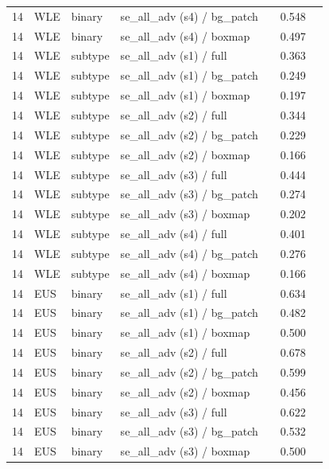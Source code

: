 \begin{longtable}{cL{1.1cm}L{1.5cm}L{5.6cm}ccc}
14 & WLE & binary & se\_all\_adv (s4) / bg\_patch & \nl{} & 0.548 & \nl{} \\
14 & WLE & binary & se\_all\_adv (s4) / boxmap & \nl{} & 0.497 & \nl{} \\
14 & WLE & subtype & se\_all\_adv (s1) / full & \nl{} & 0.363 & \nl{} \\
14 & WLE & subtype & se\_all\_adv (s1) / bg\_patch & \nl{} & 0.249 & \nl{} \\
14 & WLE & subtype & se\_all\_adv (s1) / boxmap & \nl{} & 0.197 & \nl{} \\
14 & WLE & subtype & se\_all\_adv (s2) / full & \nl{} & 0.344 & \nl{} \\
14 & WLE & subtype & se\_all\_adv (s2) / bg\_patch & \nl{} & 0.229 & \nl{} \\
14 & WLE & subtype & se\_all\_adv (s2) / boxmap & \nl{} & 0.166 & \nl{} \\
14 & WLE & subtype & se\_all\_adv (s3) / full & \nl{} & 0.444 & \nl{} \\
14 & WLE & subtype & se\_all\_adv (s3) / bg\_patch & \nl{} & 0.274 & \nl{} \\
14 & WLE & subtype & se\_all\_adv (s3) / boxmap & \nl{} & 0.202 & \nl{} \\
14 & WLE & subtype & se\_all\_adv (s4) / full & \nl{} & 0.401 & \nl{} \\
14 & WLE & subtype & se\_all\_adv (s4) / bg\_patch & \nl{} & 0.276 & \nl{} \\
14 & WLE & subtype & se\_all\_adv (s4) / boxmap & \nl{} & 0.166 & \nl{} \\
14 & EUS & binary & se\_all\_adv (s1) / full & \nl{} & 0.634 & \nl{} \\
14 & EUS & binary & se\_all\_adv (s1) / bg\_patch & \nl{} & 0.482 & \nl{} \\
14 & EUS & binary & se\_all\_adv (s1) / boxmap & \nl{} & 0.500 & \nl{} \\
14 & EUS & binary & se\_all\_adv (s2) / full & \nl{} & 0.678 & \nl{} \\
14 & EUS & binary & se\_all\_adv (s2) / bg\_patch & \nl{} & 0.599 & \nl{} \\
14 & EUS & binary & se\_all\_adv (s2) / boxmap & \nl{} & 0.456 & \nl{} \\
14 & EUS & binary & se\_all\_adv (s3) / full & \nl{} & 0.622 & \nl{} \\
14 & EUS & binary & se\_all\_adv (s3) / bg\_patch & \nl{} & 0.532 & \nl{} \\
14 & EUS & binary & se\_all\_adv (s3) / boxmap & \nl{} & 0.500 & \nl{} \\

\end{longtable}
